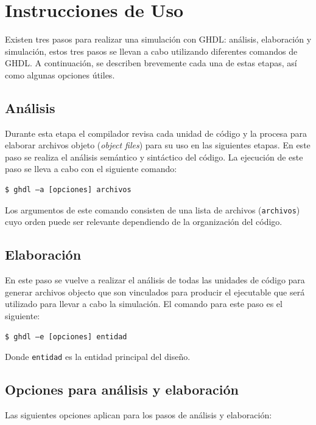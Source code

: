 \documentclass[11pt]{article}
\begin{document}
\section{Instrucciones de Uso}
Existen tres pasos para realizar una simulación con GHDL: análisis, 
elaboración y simulación, estos tres pasos se llevan a cabo
utilizando diferentes comandos de GHDL. A continuación, se describen
brevemente cada una de estas etapas, así como algunas opciones útiles.

\subsection{Análisis}

Durante esta etapa el compilador revisa cada unidad de código y la procesa
para elaborar archivos objeto (\textit{object files}) para su uso en las siguientes
etapas. En este paso se realiza el análisis semántico y sintáctico del
código. La ejecución de este paso se lleva a cabo con el siguiente
comando: 
\begin{Verbatim}[frame=single]
$ ghdl –a [opciones] archivos
\end{Verbatim}

Los argumentos de este comando consisten de una lista de archivos
(\Verb*#archivos#) cuyo orden puede ser relevante dependiendo de la 
organización del código.

\subsection{Elaboración}

En este paso se vuelve a realizar el análisis de todas las unidades de
código para generar archivos objecto que son vinculados para producir el
ejecutable que será utilizado para llevar a cabo la simulación. El comando
para este paso es el siguiente: 

\begin{Verbatim}[frame=single] 
$ ghdl –e [opciones] entidad 
\end{Verbatim}

Donde \Verb#entidad# es la entidad principal del diseño.

\subsection{Opciones para análisis y elaboración}

Las siguientes opciones aplican para los pasos de análisis y elaboración:
\end{document}
